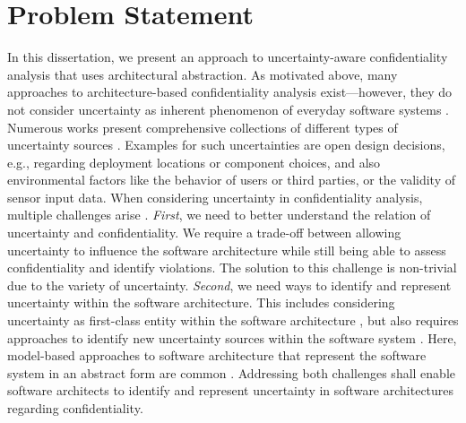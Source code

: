 \section{Problem Statement}%
\label{sec:introduction:problem}

In this dissertation, we present an approach to uncertainty-aware confidentiality analysis that uses architectural abstraction.
As motivated above, many approaches to architecture-based confidentiality analysis exist---however, they do not consider uncertainty as inherent phenomenon of everyday software systems \cite{seifermann_architectural_2022,walter_context-based_2023,pilipchuk_architectural_2021,schneider_automatic_2023,peldszus_secure_2019,boltz_extensible_2024}.
Numerous works present comprehensive collections of different types of uncertainty sources \cite{perez-palacin_uncertainties_2014,ramirez_taxonomy_2012,troya_uncertainty_2021,camara_uncertainty_2017}.
Examples for such uncertainties are open design decisions, e.g., regarding deployment locations or component choices, and also environmental factors like the behavior of users or third parties, or the validity of sensor input data.
When considering uncertainty in confidentiality analysis, multiple challenges arise \cite{hahner_dealing_2021}.
\emph{First}, we need to better understand the relation of uncertainty and confidentiality.
We require a trade-off between allowing uncertainty to influence the software architecture while still being able to assess confidentiality and identify violations.
The solution to this challenge is non-trivial due to the variety of uncertainty.
\emph{Second}, we need ways to identify and represent uncertainty within the software architecture.
This includes considering uncertainty as first-class entity within the software architecture \cite{garlan_software_2010}, but also requires approaches to identify new uncertainty sources within the software system \cite{garlan_unknown_2021}.
Here, model-based approaches to software architecture that represent the software system in an abstract form are common \cite{reussner_modeling_2016,goos_umlsec_2002,katkalov_model-driven_2013,troya_uncertainty_2021}.
Addressing both challenges shall enable software architects to identify and represent uncertainty in software architectures regarding confidentiality. 

